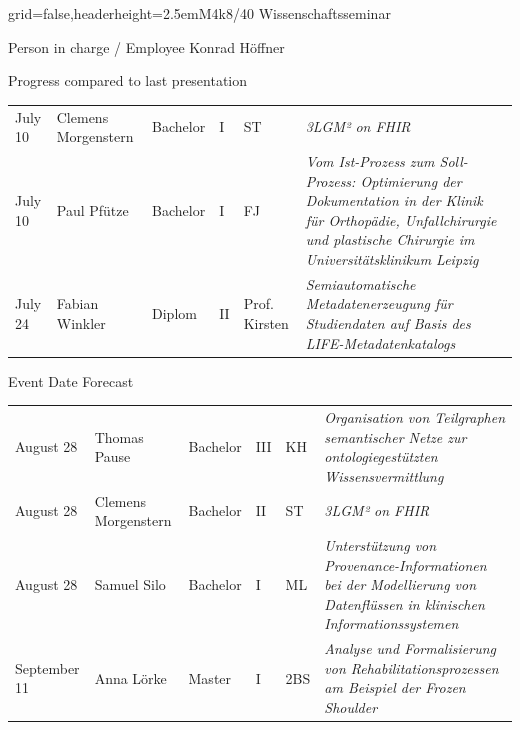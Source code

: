 \documentclass[english]{kiesgrube}
\begin{document}
\begin{poster}{grid=false,headerheight=2.5em}{}{M4k8/40 Wissenschaftsseminar}{}{}
\begin{posterbox}[name=person,column=0,row=0]{Person in charge / Employee}
Konrad Höffner
\end{posterbox}
\begin{posterbox}[name=progress,below=person,span=2]{Progress compared to last presentation}
\small
\begin{tabulary}{\textwidth}{lllllL}
July 10	&Clemens Morgenstern		&Bachelor	&I		&ST	&\emph{3LGM² on FHIR}\\
July 10	&Paul Pfütze			&Bachelor	&I		&FJ	&\emph{Vom Ist-Prozess zum Soll-Prozess: Optimierung der Dokumentation in der Klinik für Orthopädie, Unfallchirurgie und plastische Chirurgie im Universitätsklinikum Leipzig}\\
July 24	&Fabian Winkler			&Diplom		&II		&Prof. Kirsten	&\emph{Semiautomatische Metadatenerzeugung für Studiendaten auf Basis des LIFE-Metadatenkatalogs}\\
\end{tabulary}
\end{posterbox}
\begin{posterbox}[name=event,below=progress,span=2]{Event Date Forecast}
\small
\begin{tabulary}{\textwidth}{lllllL}
August 28	&Thomas Pause			&Bachelor	&III		&KH	&\emph{Organisation von Teilgraphen semantischer Netze zur ontologiegestützten Wissensvermittlung}\\
August 28	&Clemens Morgenstern		&Bachelor	&II		&ST	&\emph{3LGM² on FHIR}\\
August 28	&Samuel Silo			&Bachelor	&I		&ML	&\emph{Unterstützung von Provenance-Informationen bei der Modellierung von Datenflüssen in klinischen Informationssystemen}\\
September 11	&Anna Lörke			&Master		&I		&2BS	&\emph{Analyse und Formalisierung von Rehabilitationsprozessen am Beispiel der Frozen Shoulder}\\

\end{tabulary}
\end{posterbox}
\end{poster}
\end{document}
